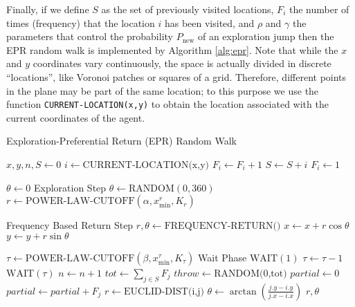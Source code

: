%
Finally, if we define $S$ as the set of previously visited locations, $F_i$ the number of times (frequency) that the location $i$ has been visited, and $\rho$ and $\gamma$ the parameters that control the probability $P_{\text{new}}$ of an exploration jump then the EPR random walk is implemented by Algorithm \ref{alg:epr}. Note that while the $x$ and $y$ coordinates vary continuously, the space is actually divided in discrete ``locations'', like Voronoi patches or squares of a grid. Therefore, different points in the plane may be part of the same location; to this purpose we use the function \texttt{CURRENT-LOCATION(x,y)} to obtain the location associated with the current coordinates of the agent.

\begin{algorithm}
\caption{Exploration-Preferential Return (EPR) Random Walk}
\label{alg:epr}
\begin{algorithmic}[1]
\State $x, y, n, S \gets 0$
    	\State $i \gets \text{CURRENT-LOCATION(x,y)}$
        	\State $F_i \gets F_i + 1$
        \Else
        	\State $S \gets S + i$
            \State $F_i \gets 1$
        \EndIf
        
        \State $\theta \gets 0$
         \Comment Exploration Step
        	\State $\theta \gets \text{RANDOM}(0,360)$
			\State $r \gets \text{POWER-LAW-CUTOFF}(\alpha, x^{r}_{\text{min}}, K_{r})$

        \Else \Comment Frequency Based Return Step
        	\State $r, \theta \gets \text{FREQUENCY-RETURN()}$
        \EndIf
        \State $x \gets x + r \cos \theta$
		\State $y \gets y + r \sin \theta$
        
    	\State $\tau \gets \text{POWER-LAW-CUTOFF}(\beta, x^{\tau}_{\text{min}}, K_{\tau})$  \Comment Wait Phase
				\State $\text{WAIT}(1)$
				\State $\tau \gets \tau - 1$
			\Else
				\State $\text{WAIT}(\tau)$
			\EndIf
		\EndWhile
		\State $n \gets n+1$
	\EndWhile
\EndProcedure
{}
	\State $tot \gets \sum_{j \in S} F_j$
    \State $throw \gets \text{RANDOM(0,tot)}$
    \State $partial \gets 0$
       	\State $partial \gets partial + F_j$
           	\State $r \gets \text{EUCLID-DIST(i,j)}$
            \State $\theta \gets \arctan \left( \frac{j.y - i.y}{j.x - i.x} \right)$
            \State \Return $r,\theta$
        \EndIf
    \EndFor
\EndFunction
\end{algorithmic}
\end{algorithm}

